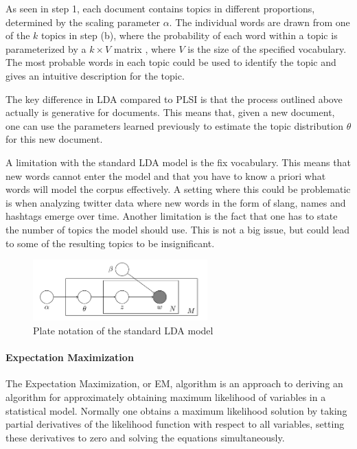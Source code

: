 \documentclass[12pt]{report}
\begin{document}
As seen in step 1, each document contains topics in different proportions,
determined by the scaling parameter $\alpha$. The individual words are drawn
from one of the $k$ topics in step (b), where the probability of each word
within a topic is parameterized by a $k \times V$ matrix , where $V$ is the
size of the specified vocabulary. The most probable words in each topic could
be used to identify the topic and gives an intuitive description for the topic.
 
The key difference in LDA compared to PLSI is that the process outlined above
actually is generative for documents. This means that, given a new document,
one can use the parameters learned previously to estimate the topic
distribution $\theta$ for this new document.
 
A limitation with the standard LDA model is the fix vocabulary. This means that
new words cannot enter the model and that you have to know a priori what words
will model the corpus effectively. A setting where this could be problematic is
when analyzing twitter data where new words in the form of slang, names and
hashtags emerge over time. Another limitation is the fact that one has to state
the number of topics the model should use. This is not a big issue, but could
lead to some of the resulting topics to be insignificant.

\begin{figure}
\centering
\includegraphics[width=0.6\textwidth]{LDA_standard_model.png}
\caption{Plate notation of the standard LDA model}
\end{figure}


\paragraph{Expectation Maximization}

The Expectation Maximization, or EM, algorithm is an approach to deriving an
algorithm for approximately obtaining maximum likelihood of variables in a
statistical model. Normally one obtains a maximum likelihood solution by taking
partial derivatives of the likelihood function with respect to all variables,
setting these derivatives to zero and solving the equations simultaneously.
\end{document}
